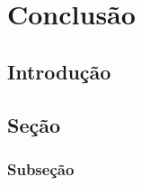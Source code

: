 \chapter{Conclusão}

\section{Introdução}

\lipsum[1-4]

\section{Seção}

\lipsum[2-4]

\subsection{Subseção}

\lipsum[2-4]